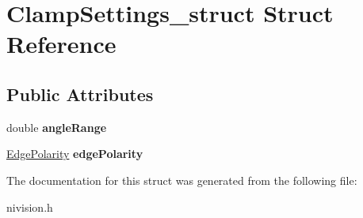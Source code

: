 \hypertarget{structClampSettings__struct}{
\section{ClampSettings\_\-struct Struct Reference}
\label{structClampSettings__struct}
}
\subsection*{Public Attributes}
\begin{DoxyCompactItemize}
\item 
\hypertarget{structClampSettings__struct_ae7052d9be65a5dd74cfec9a5c8ca3a74}{
double {\bfseries angleRange}}
\label{structClampSettings__struct_ae7052d9be65a5dd74cfec9a5c8ca3a74}

\item 
\hypertarget{structClampSettings__struct_a845e60c6a689519e9cc4d3b5acdbed56}{
\hyperlink{structEdgePolarity__struct}{EdgePolarity} {\bfseries edgePolarity}}
\label{structClampSettings__struct_a845e60c6a689519e9cc4d3b5acdbed56}

\end{DoxyCompactItemize}


The documentation for this struct was generated from the following file:\begin{DoxyCompactItemize}
\item 
nivision.h\end{DoxyCompactItemize}
